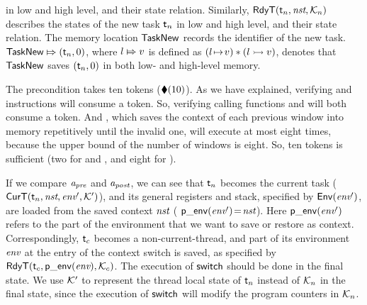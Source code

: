 in low and high level, and their state relation. 
Similarly, $\textsf{RdyT}({\textsf{t}_n}, {\textit{nst}}, {\mathcal{K}_n})$
describes the states of the new task $\textsf{t}_n$ in low and high level,
and their state relation.
The memory location
$\mathsf{TaskNew}$ records the identifier of the new task.
${\mathsf{TaskNew}}\Mapsto{(\textsf{t}_n, 0)}$, where ${l}\Mapsto{v}$ 
is defined as $({l} \!\mapsto\! {v}) * ({l} \rightarrowtail {v})$, 
denotes that
$\mathsf{TaskNew}$ saves $(\textsf{t}_n, 0)$
in both low- and high-level memory.

The precondition takes ten tokens ($\blacklozenge({10})$).
As we have explained, verifying \call{}
and \jmp{} instructions will consume a token.
So, verifying calling functions
\regsave{} and \regrestore{} will
both consume a token. And \SaveUsedWin{},
which saves the context of each previous window
into memory repetitively until the invalid one,
will execute at most eight times,
because the upper bound of
the number of windows is eight.
So, ten tokens is sufficient (two for \regsave{} and
\regrestore{}, and eight for \SaveUsedWin{}).

If we compare $\textit{a}_\textit{pre}$ and $\textit{a}_\textit{post}$, we can see that
$\textsf{t}_n$ becomes the current task
($\textsf{CurT}({\textsf{t}_n}, {\textit{nst}}, {\textit{env}'}, {\mathcal{K}'})$),
and its general registers and stack, specified by
$\mathsf{Env}({\textit{env}'})$, are loaded from the saved context
$\textit{nst}$ (\ie{} $\mathsf{p\_env}({\textit{env}'})\!=\!\textit{nst}$).
Here $\mathsf{p\_env}({\textit{env}'})$ refers to the part of the environment
that we want to save or restore as context.
Correspondingly, $\textsf{t}_c$ becomes a non-current-thread,
and part of its environment $\textit{env}$ at the entry of
the context switch is saved, as specified by
$\textsf{RdyT}({\textsf{t}_c}, {\mathsf{p\_env}({\textit{env}})}, {\mathcal{K}_c})$.
The execution of $\mathsf{switch}$ should be done in the final state.
We use $\mathcal{K}'$ to represent the thread local
state of $\textsf{t}_n$ instead of $\mathcal{K}_n$
in the final state, since the execution of
$\mathsf{switch}$ will modify the program counters
in $\mathcal{K}_n$.

